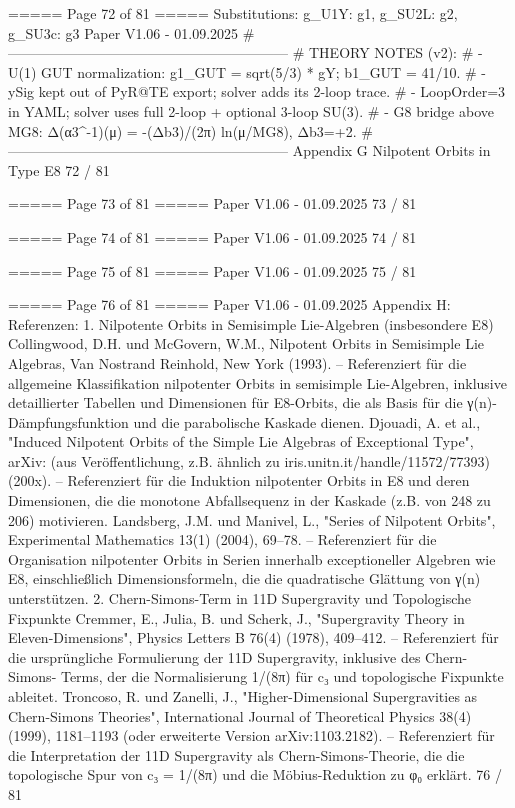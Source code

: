 \begin{MyVerbatim}
{{===== Page 72 of 81 =====
Substitutions: { g_U1Y: g1, g_SU2L: g2, g_SU3c: g3 }
Paper V1.06 - 01.09.2025
# ------------------------------------------------------------
# THEORY NOTES (v2):
# - U(1) GUT normalization: g1_GUT = sqrt(5/3) * gY; b1_GUT = 41/10.
# - ySig kept out of PyR@TE export; solver adds its 2-loop trace.
# - LoopOrder=3 in YAML; solver uses full 2-loop + optional 3-loop SU(3).
# - G8 bridge above MG8: Δ(α3^{-1})(μ) = -(Δb3)/(2π) ln(μ/MG8), Δb3=+2.
# ------------------------------------------------------------
Appendix G Nilpotent Orbits in Type E8
72 / 81

===== Page 73 of 81 =====
Paper V1.06 - 01.09.2025
73 / 81

===== Page 74 of 81 =====
Paper V1.06 - 01.09.2025
74 / 81

===== Page 75 of 81 =====
Paper V1.06 - 01.09.2025
75 / 81

===== Page 76 of 81 =====
Paper V1.06 - 01.09.2025
Appendix H: Referenzen:
1. Nilpotente Orbits in Semisimple Lie-Algebren (insbesondere E8)
Collingwood, D.H. und McGovern, W.M., Nilpotent Orbits in Semisimple Lie Algebras, Van Nostrand Reinhold, New
York (1993). – Referenziert für die allgemeine Klassifikation nilpotenter Orbits in semisimple Lie-Algebren, inklusive
detaillierter Tabellen und Dimensionen für E8-Orbits, die als Basis für die γ(n)-Dämpfungsfunktion und die
parabolische Kaskade dienen.
Djouadi, A. et al., "Induced Nilpotent Orbits of the Simple Lie Algebras of Exceptional Type", arXiv: (aus
Veröffentlichung, z.B. ähnlich zu iris.unitn.it/handle/11572/77393) (200x). – Referenziert für die Induktion nilpotenter
Orbits in E8 und deren Dimensionen, die die monotone Abfallsequenz in der Kaskade (z.B. von 248 zu 206)
motivieren.
Landsberg, J.M. und Manivel, L., "Series of Nilpotent Orbits", Experimental Mathematics 13(1) (2004), 69–78. –
Referenziert für die Organisation nilpotenter Orbits in Serien innerhalb exceptioneller Algebren wie E8, einschließlich
Dimensionsformeln, die die quadratische Glättung von γ(n) unterstützen.
2. Chern-Simons-Term in 11D Supergravity und Topologische Fixpunkte
Cremmer, E., Julia, B. und Scherk, J., "Supergravity Theory in Eleven-Dimensions", Physics Letters B 76(4) (1978),
409–412. – Referenziert für die ursprüngliche Formulierung der 11D Supergravity, inklusive des Chern-Simons-
Terms, der die Normalisierung 1/(8π) für c₃ und topologische Fixpunkte ableitet.
Troncoso, R. und Zanelli, J., "Higher-Dimensional Supergravities as Chern-Simons Theories", International Journal of
Theoretical Physics 38(4) (1999), 1181–1193 (oder erweiterte Version arXiv:1103.2182). – Referenziert für die
Interpretation der 11D Supergravity als Chern-Simons-Theorie, die die topologische Spur von c₃ = 1/(8π) und die
Möbius-Reduktion zu φ₀ erklärt.
76 / 81

}}
\end{MyVerbatim}
